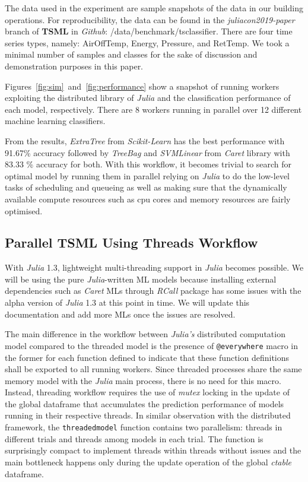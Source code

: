 \documentclass{juliacon}
\begin{document}
The data used in the experiment are sample snapshots of the data in our building operations. For reproducibility, the data can be found in the  \emph{juliacon2019-paper} branch of \textbf{TSML} in \emph{Github}:  /data/benchmark/tsclassifier. There are four time series types, namely: AirOffTemp, Energy, Pressure, and RetTemp.  We  took a minimal number of samples and classes for the sake of discussion and demonstration purposes in this paper.

\vskip 6pt

Figures~\ref{fig:sim}~and~\ref{fig:performance}  show a snapshot of running workers exploiting the distributed library of \emph{Julia} and the classification performance of each model, respectively. There are 8 workers running in parallel over 12 different machine learning classifiers. 

\vskip 6pt

From the results, \emph{ExtraTree} from \emph{Scikit-Learn} has the best performance with 91.67\% accuracy followed by \emph{TreeBag} and \emph{SVMLinear} from \emph{Caret} library with 83.33 \% accuracy for both. With this workflow, it becomes trivial to search for optimal model by running them in parallel relying on \emph{Julia} to do the low-level tasks of scheduling and queueing as well as making sure that  the dynamically available compute resources such as cpu cores and memory resources are fairly optimised.           

\subsection{Parallel TSML Using Threads Workflow}
With \emph{Julia} 1.3, lightweight multi-threading support in \emph{Julia} becomes possible. We will be using the pure \emph{Julia}-written ML models because installing external dependencies such as \emph{Caret} MLs through \emph{RCall} package has some issues with the alpha version of \emph{Julia} 1.3 at this point in time. We will update this documentation and add more MLs once the issues are resolved.

\vskip 6pt

The main difference in the workflow between \emph{Julia's} distributed computation model compared to the threaded model is the presence of \texttt{@everywhere} macro in the former for each function defined to indicate that these function definitions shall be exported to all running workers. Since threaded processes share the same memory model with the \emph{Julia} main process, there is no need for this macro. Instead, threading workflow requires the use of \emph{mutex} locking in the update of the global dataframe that accumulates the prediction performance of models running in their respective threads. In similar observation with the distributed framework, the \texttt{threadedmodel} function contains two parallelism: threads in different trials and threads among models in each trial. The function is surprisingly compact to implement threads within threads without issues and the main bottleneck happens only during the update operation of the global \emph{ctable} dataframe.
\end{document}
